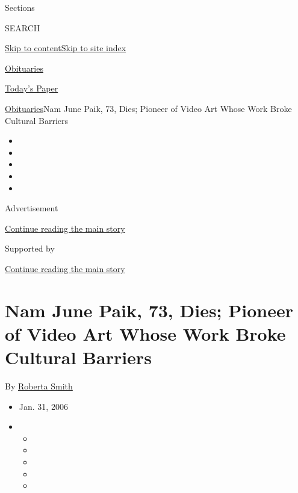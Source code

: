 Sections

SEARCH

\protect\hyperlink{site-content}{Skip to
content}\protect\hyperlink{site-index}{Skip to site index}

\href{https://www.nytimes3xbfgragh.onion/section/obituaries}{Obituaries}

\href{https://myaccount.nytimes3xbfgragh.onion/auth/login?response_type=cookie\&client_id=vi}{}

\href{https://www.nytimes3xbfgragh.onion/section/todayspaper}{Today's
Paper}

\href{/section/obituaries}{Obituaries}\textbar{}Nam June Paik, 73, Dies;
Pioneer of Video Art Whose Work Broke Cultural Barriers

\begin{itemize}
\item
\item
\item
\item
\item
\end{itemize}

Advertisement

\protect\hyperlink{after-top}{Continue reading the main story}

Supported by

\protect\hyperlink{after-sponsor}{Continue reading the main story}

\hypertarget{nam-june-paik-73-dies-pioneer-of-video-art-whose-work-broke-cultural-barriers}{%
\section{Nam June Paik, 73, Dies; Pioneer of Video Art Whose Work Broke
Cultural
Barriers}\label{nam-june-paik-73-dies-pioneer-of-video-art-whose-work-broke-cultural-barriers}}

By \href{https://www.nytimes3xbfgragh.onion/by/roberta-smith}{Roberta
Smith}

\begin{itemize}
\item
  Jan. 31, 2006
\item
  \begin{itemize}
  \item
  \item
  \item
  \item
  \item
  \end{itemize}
\end{itemize}

